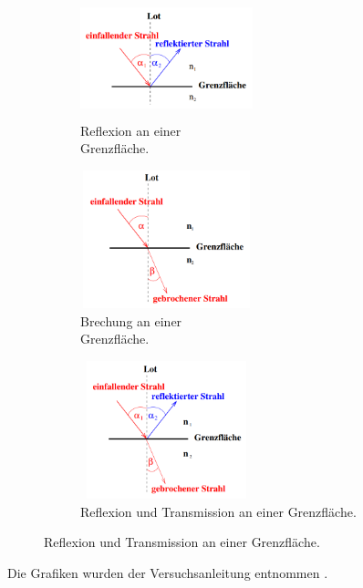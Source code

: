 \begin{figure}[H]
    \centering
    \begin{subfigure}[b]{0.3\textwidth}
        \centering
        \includegraphics[width=5cm, height=3.5cm]{img/reflexion.png}
        \caption[]
        {{\small Reflexion an einer\\Grenzfläche.}}    
        \label{fig:reflexion}
    \end{subfigure}
    \hfill
    \begin{subfigure}[b]{0.3\textwidth}  
        \centering 
        \includegraphics[width=5cm, height=4cm]{img/brechung.png}
        \caption[]
        {{\small Brechung an einer\\Grenzfläche.}}    
        \label{fig:brechung}
    \end{subfigure}
    \hfill
    \begin{subfigure}[b]{0.3\textwidth}  
        \centering 
        \includegraphics[width=5cm, height=4cm]{img/reflexion_transmission.png}
        \caption[]
        {{\small Reflexion und Transmission an einer Grenzfläche.}}    
        \label{fig:reflexion_transmission}
    \end{subfigure}
\end{figure}
Die Grafiken wurden der Versuchsanleitung entnommen \cite{V400}.
